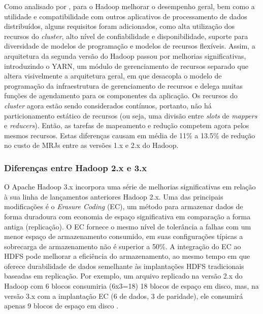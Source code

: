 Como analisado por \cite{glushkova2019mapreduce}, para o Hadoop melhorar o desempenho geral, bem como a utilidade e compatibilidade com outros aplicativos de processamento de dados distribuídos, alguns requisitos foram adicionados, como alta utilização dos recursos do \emph{cluster}, alto nível de confiabilidade e disponibilidade, suporte para diversidade de modelos de programação e modelos de recursos flexíveis. Assim, a arquitetura da segunda versão do Hadoop passou por melhorias significativas, introduzindo o YARN, um módulo de gerenciamento de recursos separado que altera visivelmente a arquitetura geral, em que desacopla o modelo de programação da infraestrutura de gerenciamento de recursos e delega muitas funções de agendamento para os componentes da aplicação. Os recursos do \emph{cluster} agora estão sendo considerados contínuos, portanto, não há particionamento estático de recursos (ou seja, uma divisão entre \emph{slots} de \emph{mappers} e \emph{reducers}). Então, as tarefas de mapeamento e redução competem agora pelos mesmos recursos. Estas diferenças causam em média de 11\% a 13.5\% de redução no custo de MRJs entre as versões 1.x e 2.x do Hadoop.

\subsubsection{Diferenças entre Hadoop 2.x e 3.x}

O Apache Hadoop 3.x incorpora uma série de melhorias significativas em relação à sua linha de lançamentos anteriores Hadoop 2.x. Uma das principais modificações é o \emph{Erasure Coding} (EC), um método para armazenar dados de forma duradoura com economia de espaço significativa em comparação a forma antiga (replicação). O EC fornece o mesmo nível de tolerância a falhas com um menor espaço de armazenamento consumido, em suas configurações típicas a sobrecarga de armazenamento não é superior a 50\%. A integração do EC ao HDFS pode melhorar a eficiência do armazenamento, ao mesmo tempo em que oferece durabilidade de dados semelhante às implantações HDFS tradicionais baseadas em replicação. Por exemplo, um arquivo replicado na versão 2.x do Hadoop com 6 blocos consumiria (6x3=18) 18 blocos de espaço em disco, mas, na versão 3.x com a implantação EC (6 de dados, 3 de paridade), ele consumirá apenas 9 blocos de espaço em disco \cite{hadoop3.0.0release}.



